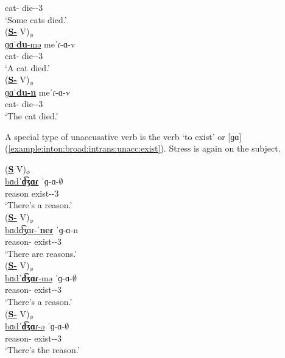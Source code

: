 \begin{exe}
\begin{xlist}
\begin{xlist}
			cat-{\pl} die-{\pst}-3{\pl} \\
			\trans `Some cats died.'
			\\
			\ex \glll (\textbf{\underline{S-{\indf}}} V)$_\phi$ \\
			\underline{ɡɑˈ\textbf{du}-mə} meˈɾ-ɑ-v \\
			cat-{\indf} die-{\pst}-3{\sg} \\
			\trans `A cat  died.'
			\\
			\ex \glll (\textbf{\underline{S-{}}} V)$_\phi$ \\
			\underline{ɡɑˈ\textbf{du-n}} meˈɾ-ɑ-v \\
			cat-{} die-{\pst}-3{\sg} \\
			\trans `The cat  died.'
			\\
			
		\end{xlist}
		
	\end{xlist}
\end{exe}

A special type of unaccusative verb is the verb `to exist' or [ɡɑ] (\ref{example:inton:broad:intrans:unacc:exist}). Stress is again on the subject.  


\begin{exe}
	\ex \label{example:inton:broad:intrans:unacc:exist}\begin{xlist}
		\ex \glll (\textbf{\underline{S}} V)$_\phi$ \\
		\underline{bɑdˈ\textbf{d͡ʒɑɾ}} ˈɡ-ɑ-$\emptyset$  \\
		reason exist-{\thgloss}-3{\sg} \\
		\trans `There's a reason.' 
		\\
		\ex \glll (\textbf{\underline{S-{\pl}}} V)$_\phi$ \\
		\underline{bɑdd͡ʒɑɾ-ˈ\textbf{neɾ}} ˈɡ-ɑ-n  \\
		reason-{\pl} exist-{\thgloss}-3{\pl} \\
		\trans `There are   reasons.'
		\\
		\ex \glll (\textbf{\underline{S-{\indf}}} V)$_\phi$ \\
		\underline{bɑdˈ\textbf{d͡ʒɑɾ}-mə}  ˈɡ-ɑ-$\emptyset$  \\
		reason-{\indf}  exist-{\thgloss}-3{\sg} \\
		\trans `There's a reason.'
		\\
		\ex \glll (\textbf{\underline{S-{}}} V)$_\phi$ \\
		\underline{bɑdˈ\textbf{d͡ʒɑ}ɾ-ə}  ˈɡ-ɑ-$\emptyset$  \\
		reason-{} exist-{\thgloss}-3{\sg} \\
		\trans `There's the reason.'
		\\
	\end{xlist}
\end{exe}

